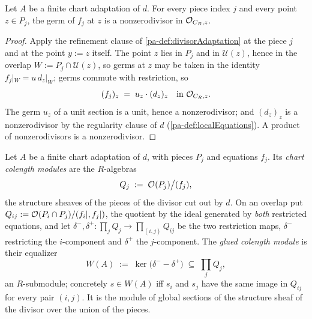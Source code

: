 \begin{lemma}
  \label{pa-lem:divisorAdaptation_eqn_regular}
  \leanok

  Let \(A\) be a finite chart adaptation of \(d\). For every piece index \(j\) and every
  point \(z \in P_j\), the germ of \(f_j\) at \(z\) is a nonzerodivisor in
  \(\mathcal{O}_{C_R,z}\).
\end{lemma}
\begin{proof}
  \leanok
  Apply the refinement clause of \ref{pa-def:divisorAdaptation} at the piece \(j\) and at the
  point \(y := z\) itself. The point \(z\) lies in \(P_j\) and in \(\mathcal U(z)\), hence
  in the overlap \(W := P_j \cap \mathcal U(z)\), so germs at \(z\) may be taken in the
  identity \(f_j|_W = u\, d_z|_W\); germs commute with restriction, so
  \[
    (f_j)_z \;=\; u_z \cdot (d_z)_z \quad\text{in } \mathcal{O}_{C_R,z}.
  \]
  The germ \(u_z\) of a unit section is a unit, hence a nonzerodivisor; and \((d_z)_z\) is
  a nonzerodivisor by the regularity clause of \(d\) (\ref{pa-def:localEquations}). A product
  of nonzerodivisors is a nonzerodivisor.
\end{proof}

\begin{definition}
  \label{pa-def:gluedColength}
  \leanok

  Let \(A\) be a finite chart adaptation of \(d\), with pieces \(P_j\) and equations
  \(f_j\). Its \emph{chart colength modules} are the \(R\)-algebras
  \[
    Q_j \;:=\; \mathcal{O}_{}(P_j) \big/ (f_j),
  \]
  the structure sheaves of the pieces of the divisor cut out by \(d\). On an overlap put
  \(Q_{ij} := \mathcal{O}_{}(P_i \cap P_j)/(f_i|, f_j|)\), the quotient by the ideal generated
  by \emph{both} restricted equations, and let \(\delta^-, \delta^+ \colon \prod_j Q_j \to
  \prod_{(i,j)} Q_{ij}\) be the two restriction maps, \(\delta^-\) restricting the
  \(i\)-component and \(\delta^+\) the \(j\)-component. The \emph{glued colength module} is
  their equalizer
  \[
    W(A) \;:=\; \ker\bigl(\delta^- - \delta^+\bigr) \;\subseteq\; \prod_j Q_j ,
  \]
  an \(R\)-submodule; concretely \(s \in W(A)\) iff \(s_i\) and \(s_j\) have the same image
  in \(Q_{ij}\) for every pair \((i,j)\). It is the module of global sections of the
  structure sheaf of the divisor over the union of the pieces.
\end{definition}

